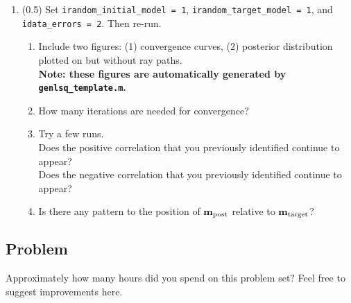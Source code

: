 \documentclass[11pt,titlepage,fleqn]{article}
\begin{document}
\begin{enumerate}
\item (0.5) Set \verb+irandom_initial_model = 1+, \verb+irandom_target_model = 1+, and \verb+idata_errors = 2+. Then re-run.
%
\begin{enumerate}
\item Include two figures: (1) convergence curves, (2) posterior distribution plotted on  but without ray paths. \\
{\bf Note: these figures are automatically generated by \verb+genlsq_template.m+.}
\item How many iterations are needed for convergence?
\item Try a few runs. \\
Does the positive correlation that you previously identified continue to appear? \\
Does the negative correlation that you previously identified continue to appear?
\item Is there any pattern to the position of $\mbox{${\bf m}$}_{\rm post}$ relative to $\mbox{${\bf m}$}_{\rm target}$?
\end{enumerate}

\end{enumerate}


\subsection*{Problem}

Approximately how many hours did you spend on this problem set? Feel free to suggest improvements here.




\end{document}
